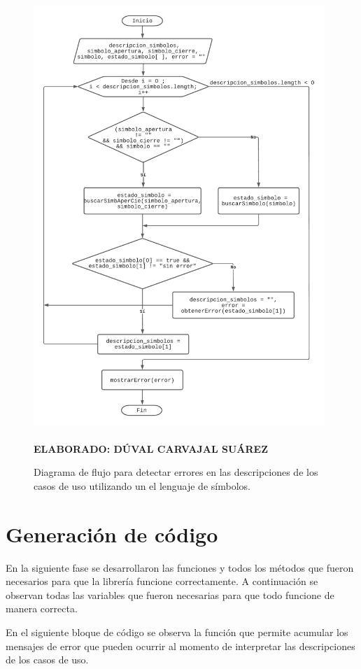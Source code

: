 \begin{figure}[h!]
	\caption{Diagrama de flujo para detectar errores en las descripciones de los casos de uso utilizando un el lenguaje de símbolos.}
	\includegraphics[width=11cm]{img/algoritmoerror.png}
	\label{fig:algoritmoerror}
	\textbf{\\ \\ ELABORADO: DÚVAL CARVAJAL SUÁREZ}
\end{figure} 

\section{Generación de código}

En la siguiente fase se desarrollaron las funciones y todos los métodos que fueron necesarios para que la librería funcione correctamente. A continuación se observan todas las variables que fueron necesarias para que todo funcione de manera correcta.



En el siguiente bloque de código se observa la función que permite acumular los mensajes de error que pueden ocurrir al momento de interpretar las descripciones de los casos de uso. 

